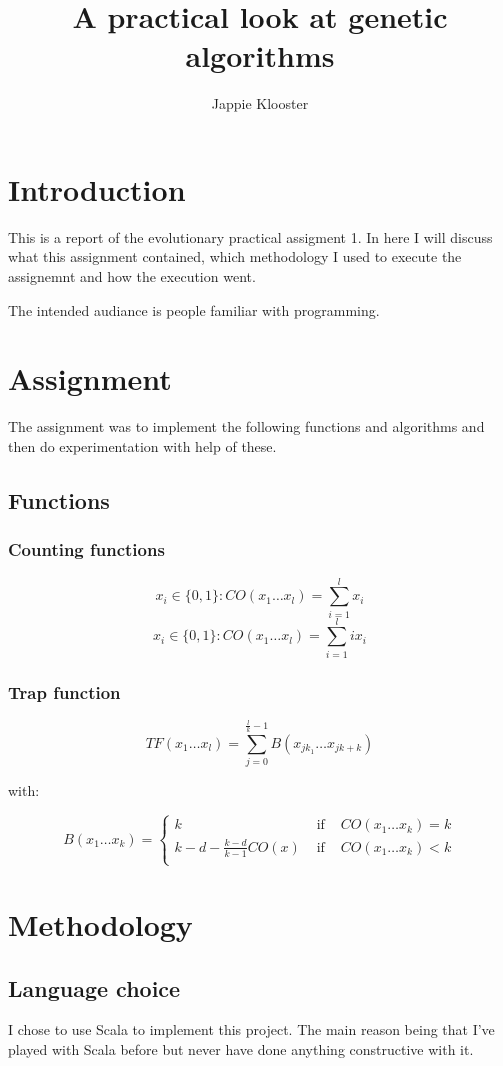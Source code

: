 \documentclass{article}
\begin{document}
\author{Jappie Klooster}
\title{A practical look at genetic algorithms}
\maketitle

\section{Introduction}
This is a report of the evolutionary practical assigment 1.
In here I will discuss what this assignment contained, which
methodology I used to execute the assignemnt and how the execution
went.

The intended audiance is people familiar with programming.

\section{Assignment}
The assignment was to implement the following functions and algorithms and
then do experimentation with help of these.

\subsection{Functions}
\subsubsection{Counting functions}
\[x_i \in \{0,1\}:CO(x_1\dots x_l)=\sum^l_{i=1}x_i\]
\[x_i \in \{0,1\}:CO(x_1\dots x_l)=\sum^l_{i=1}i x_i\]
\subsubsection{Trap function}
\[TF(x_1\dots x_l) = \sum^{\frac{l}{k}-1}_{j=0}B(x_{jk_1}\dots x_{jk+k})\]

with:

\[B(x_1\dots x_k)=\left\{
	\begin{matrix}
		k & \mbox{ if } &   CO(x_1\dots x_k) = k \\
		k - d - \frac{k-d}{k-1} CO(x) & \mbox{ if } & CO(x_1\dots x_k) < k \\
	\end{matrix}
\right. \]
\section{Methodology}
\subsection{Language choice}
I chose to use Scala to implement this project. The main reason being that I've
played with Scala before but never have done anything constructive with it.
\end{document}
